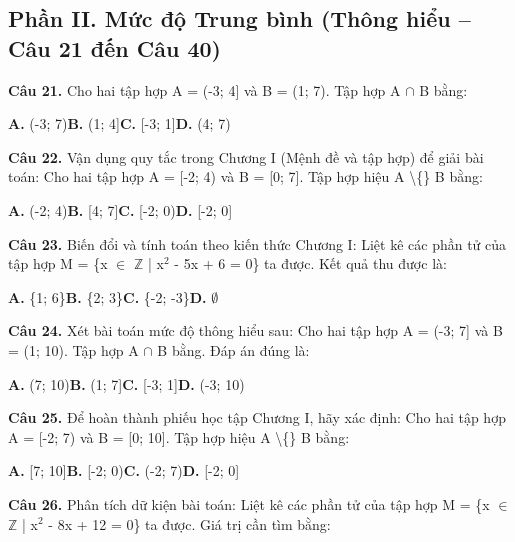 \documentclass[11pt,a4paper]{article}
\begin{document}
\subsection*{\color{accent} Phần II. Mức độ Trung bình (Thông hiểu -- Câu 21 đến Câu 40)}
\textbf{\color{primary} Câu 21.} Cho hai tập hợp A = (-3; 4] và B = (1; 7). Tập hợp A $\cap$ B bằng:\par
\hspace*{1.5em}\textbf{A.} (-3; 7)\quad\quad \textbf{B.} (1; 4]\quad\quad \textbf{C.} [-3; 1]\quad\quad \textbf{D.} (4; 7)\par\vspace{2pt}
\textbf{\color{primary} Câu 22.} Vận dụng quy tắc trong Chương I (Mệnh đề và tập hợp) để giải bài toán: Cho hai tập hợp A = [-2; 4) và B = [0; 7]. Tập hợp hiệu A \textbackslash\{\} B bằng:\par
\hspace*{1.5em}\textbf{A.} (-2; 4)\quad\quad \textbf{B.} [4; 7]\quad\quad \textbf{C.} [-2; 0)\quad\quad \textbf{D.} [-2; 0]\par\vspace{2pt}
\textbf{\color{primary} Câu 23.} Biến đổi và tính toán theo kiến thức Chương I: Liệt kê các phần tử của tập hợp M = \{x $\in$ $\mathbb{Z}$ | x$^2$ - 5x + 6 = 0\} ta được. Kết quả thu được là:\par
\hspace*{1.5em}\textbf{A.} \{1; 6\}\quad\quad \textbf{B.} \{2; 3\}\quad\quad \textbf{C.} \{-2; -3\}\quad\quad \textbf{D.} $\emptyset$\par\vspace{2pt}
\textbf{\color{primary} Câu 24.} Xét bài toán mức độ thông hiểu sau: Cho hai tập hợp A = (-3; 7] và B = (1; 10). Tập hợp A $\cap$ B bằng. Đáp án đúng là:\par
\hspace*{1.5em}\textbf{A.} (7; 10)\quad\quad \textbf{B.} (1; 7]\quad\quad \textbf{C.} [-3; 1]\quad\quad \textbf{D.} (-3; 10)\par\vspace{2pt}
\textbf{\color{primary} Câu 25.} Để hoàn thành phiếu học tập Chương I, hãy xác định: Cho hai tập hợp A = [-2; 7) và B = [0; 10]. Tập hợp hiệu A \textbackslash\{\} B bằng:\par
\hspace*{1.5em}\textbf{A.} [7; 10]\quad\quad \textbf{B.} [-2; 0)\quad\quad \textbf{C.} (-2; 7)\quad\quad \textbf{D.} [-2; 0]\par\vspace{2pt}
\textbf{\color{primary} Câu 26.} Phân tích dữ kiện bài toán: Liệt kê các phần tử của tập hợp M = \{x $\in$ $\mathbb{Z}$ | x$^2$ - 8x + 12 = 0\} ta được. Giá trị cần tìm bằng:\par
\end{document}
